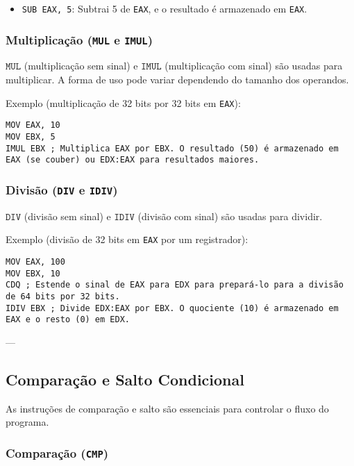 \documentclass{article}
\begin{document}
\begin{itemize}
    \item \texttt{SUB EAX, 5}: Subtrai 5 de \texttt{EAX}, e o resultado é armazenado em \texttt{EAX}.
\end{itemize}

\subsubsection{Multiplicação (\texttt{MUL} e \texttt{IMUL})}

$\texttt{MUL}$ (multiplicação sem sinal) e $\texttt{IMUL}$ (multiplicação com sinal) são usadas para multiplicar. A forma de uso pode variar dependendo do tamanho dos operandos.

Exemplo (multiplicação de 32 bits por 32 bits em \texttt{EAX}):

\begin{verbatim}
MOV EAX, 10
MOV EBX, 5
IMUL EBX ; Multiplica EAX por EBX. O resultado (50) é armazenado em EAX (se couber) ou EDX:EAX para resultados maiores.
\end{verbatim}

\subsubsection{Divisão (\texttt{DIV} e \texttt{IDIV})}

$\texttt{DIV}$ (divisão sem sinal) e $\texttt{IDIV}$ (divisão com sinal) são usadas para dividir.

Exemplo (divisão de 32 bits em \texttt{EAX} por um registrador):

\begin{verbatim}
MOV EAX, 100
MOV EBX, 10
CDQ ; Estende o sinal de EAX para EDX para prepará-lo para a divisão de 64 bits por 32 bits.
IDIV EBX ; Divide EDX:EAX por EBX. O quociente (10) é armazenado em EAX e o resto (0) em EDX.
\end{verbatim}

---

\subsection{Comparação e Salto Condicional}

As instruções de comparação e salto são essenciais para controlar o fluxo do programa.

\subsubsection{Comparação (\texttt{CMP})}
\end{document}
